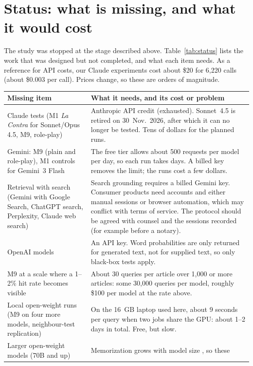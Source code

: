 \documentclass[10pt,a4paper]{article}
\begin{document}
\section{Status: what is missing, and what it would cost}\label{sec:status}
The study was stopped at the stage described above. Table~\ref{tab:status} lists the work that was designed but not
completed, and what each item needs. As a reference for API costs, our Claude experiments cost about \$20 for 6,220
calls (about \$0.003 per call). Prices change, so these are orders of magnitude.

\begin{table}[h]\centering\small
\begin{tabularx}{\linewidth}{>{\raggedright\arraybackslash}p{4.4cm}>{\raggedright\arraybackslash}X}
\toprule
Missing item & What it needs, and its cost or problem\\
\midrule
Claude tests (M1 \emph{La Contra} for Sonnet/Opus 4.5, M9, role-play) & Anthropic API credit (exhausted). Sonnet~4.5 is
retired on 30~Nov.~2026, after which it can no longer be tested. Tens of dollars for the planned runs.\\
Gemini: M9 (plain and role-play), M1 controls for Gemini~3 Flash & The free tier allows about 500 requests per model per
day, so each run takes days. A billed key removes the limit; the runs cost a few dollars.\\
Retrieval with search (Gemini with Google Search, ChatGPT search, Perplexity, Claude web search) & Search grounding
requires a billed Gemini key. Consumer products need accounts and either manual sessions or browser automation, which
may conflict with terms of service. The protocol should be agreed with counsel and the sessions recorded (for
example before a notary).\\
OpenAI models & An API key. Word probabilities are only returned for generated text, not for supplied text, so only
black-box tests apply.\\
M9 at a scale where a 1--2\% hit rate becomes visible & About 30 queries per article over 1,000 or more articles: some
30,000 queries per model, roughly \$100 per model at the rate above.\\
Local open-weight runs (M9 on four more models, neighbour-test replication) & On the 16~GB laptop used here, about
9 seconds per query when two jobs share the GPU: about 1--2 days in total. Free, but slow.\\
Larger open-weight models (70B and up) & Memorization grows with model size \cite{carlini2023,freeman2024}, so these

\end{tabularx}
\end{table}
\end{document}
